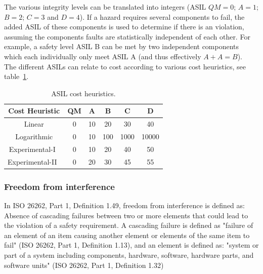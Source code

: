 The various integrity levels can be translated into integers (ASIL $QM = 0$; $A = 1$; $B = 2$; $C = 3$ and $D = 4$). If a hazard requires several components to fail, the added ASIL of these components is used to determine if there is an violation, assuming the components faults are statistically independent of each other. For example, a safety level ASIL B can be met by two independent components which each individually only meet ASIL A (and thus effectively $A + A = B$).~\cite{azevedo2014} \\ %

The different ASILs can relate to cost according to various cost heuristics, see table~\ref{table:cost_heuritics}. %

\begin{table}[H]
\centering
\begin{tabular}{|c|c|c|c|c|c|}
\hline
\textbf{Cost Heuristic} & \textbf{QM} & \textbf{A} & \textbf{B} & \textbf{C} & \textbf{D} \\ \hline
Linear & 0 & 10 & 20 & 30 & 40 \\ \hline
Logarithmic & 0 & 10 & 100 & 1000 & 10000 \\ \hline
Experimental-I~\cite{azevedo2014} & 0 & 10 & 20 & 40 & 50 \\ \hline
Experimental-II~\cite{azevedo2014} & 0 & 20 & 30 & 45 & 55 \\ \hline
\end{tabular}
\caption{ASIL cost heuristics.}
\label{table:cost_heuritics}
\end{table}


\subsubsection{Freedom from interference}
In ISO 26262, Part 1, Definition 1.49, freedom from interference is defined as: Absence of cascading failures between two or more elements that could lead to the violation of a safety requirement. A cascading failure is defined as "failure of an element of an item causing another element or elements of the same item to fail" (ISO 26262, Part 1, Definition 1.13), and an element is defined as: "system or part of a system including components, hardware, software, hardware parts, and software units" (ISO 26262, Part 1, Definition 1.32)

